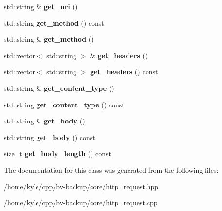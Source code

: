 \begin{DoxyCompactItemize}
std\+::string \& {\bfseries get\+\_\+uri} ()
\item 
\mbox{\label{class_backup_1_1_networking_1_1_http_request_a546d7d55c73aaaed76d07e263fbf88f0}} 
std\+::string {\bfseries get\+\_\+method} () const
\item 
\mbox{\label{class_backup_1_1_networking_1_1_http_request_a09964b0dc7c35c994b98648057b11b8c}} 
std\+::string \& {\bfseries get\+\_\+method} ()
\item 
\mbox{\label{class_backup_1_1_networking_1_1_http_request_a8ced4962bba149da8febddce83a07148}} 
std\+::vector$<$ std\+::string $>$ \& {\bfseries get\+\_\+headers} ()
\item 
\mbox{\label{class_backup_1_1_networking_1_1_http_request_a758a53c065a9ba07d12c87342cbf7488}} 
std\+::vector$<$ std\+::string $>$ {\bfseries get\+\_\+headers} () const
\item 
\mbox{\label{class_backup_1_1_networking_1_1_http_request_acdff7c432d22ac6ab7ce3eff63334ac7}} 
std\+::string \& {\bfseries get\+\_\+content\+\_\+type} ()
\item 
\mbox{\label{class_backup_1_1_networking_1_1_http_request_a4c8063b3193e997a2bf958999055ea35}} 
std\+::string {\bfseries get\+\_\+content\+\_\+type} () const
\item 
\mbox{\label{class_backup_1_1_networking_1_1_http_request_ac63afabbead609a3244dfe34518ee2b4}} 
std\+::string \& {\bfseries get\+\_\+body} ()
\item 
\mbox{\label{class_backup_1_1_networking_1_1_http_request_a77b5d51760c350a865e77c3bc0de3a42}} 
std\+::string {\bfseries get\+\_\+body} () const
\item 
\mbox{\label{class_backup_1_1_networking_1_1_http_request_ab94815165bd2457bf4f8944ffc80148f}} 
size\+\_\+t {\bfseries get\+\_\+body\+\_\+length} () const
\end{DoxyCompactItemize}


The documentation for this class was generated from the following files\+:\begin{DoxyCompactItemize}
\item 
/home/kyle/cpp/bv-\/backup/core/http\+\_\+request.\+hpp\item 
/home/kyle/cpp/bv-\/backup/core/http\+\_\+request.\+cpp\end{DoxyCompactItemize}
